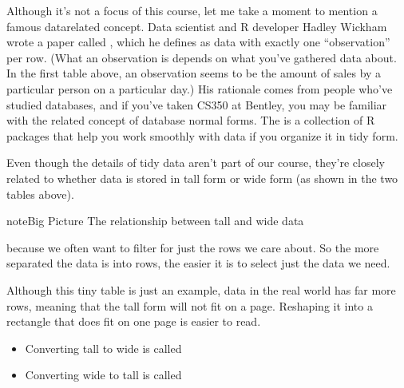 \documentclass[letterpaper,10pt,english]{jupyterBook}
\begin{document}
\sphinxAtStartPar
Although it’s not a focus of this course, let me take a moment to mention a famous data\sphinxhyphen{}related concept.  Data scientist and R developer Hadley Wickham wrote a paper called , which he defines as data with exactly one “observation” per row.  (What an observation is depends on what you’ve gathered data about.  In the first table above, an observation seems to be the amount of sales by a particular person on a particular day.)  His rationale comes from people who’ve studied databases, and if you’ve taken CS350 at Bentley, you may be familiar with the related concept of database normal forms.  The  is a collection of R packages that help you work smoothly with data if you organize it in tidy form.

\sphinxAtStartPar
Even though the details of tidy data aren’t part of our course, they’re closely related to whether data is stored in tall form or wide form (as shown in the two tables above).

\begin{sphinxadmonition}{note}{Big Picture \sphinxhyphen{} The relationship between tall and wide data}

\sphinxAtStartPar
{} because we often want to filter for just the rows we care about.  So the more separated the data is into rows, the easier it is to select just the data we need.

\sphinxAtStartPar
{}  Although this tiny table is just an example, data in the real world has far more rows, meaning that the tall form will not fit on a page.  Reshaping it into a rectangle that does fit on one page is easier to read.

\sphinxAtStartPar
{}
\begin{itemize}
\item {} 
\sphinxAtStartPar
Converting tall to wide is called 

\item {} 
\sphinxAtStartPar
Converting wide to tall is called 

\end{itemize}
\end{sphinxadmonition}
\end{document}
